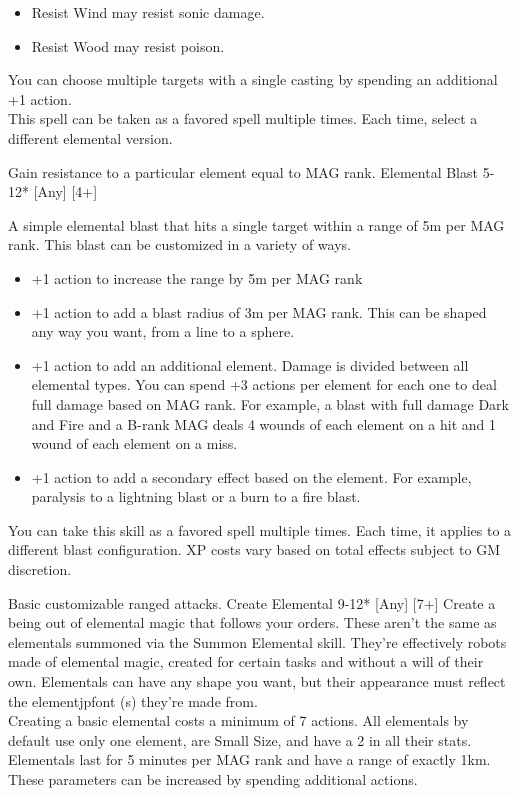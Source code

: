 \begin{pathele}
{\begin{itemize}
\item Resist Wind may resist sonic damage.
\item Resist Wood may resist poison.
\end{itemize}
You can choose multiple targets with a single casting by spending an additional +1 action.\\This spell can be taken as a favored spell multiple times. Each time, select a different elemental version.}
{Gain resistance to a particular element equal to MAG rank.}
\spelldescription
{Elemental Blast}
{5-12*}
[Any]
[4+]
{A simple elemental blast that hits a single target within a range of 5m per MAG rank. This blast can be customized in a variety of ways.
\begin{itemize}
\item +1 action to increase the range by 5m per MAG rank
\item +1 action to add a blast radius of 3m per MAG rank. This can be shaped any way you want, from a line to a sphere.
\item +1 action to add an additional element. Damage is divided between all elemental types. You can spend +3 actions per element for each one to deal full damage based on MAG rank. For example, a blast with full damage Dark and Fire and a B-rank MAG deals 4 wounds of each element on a hit and 1 wound of each element on a miss.
\item +1 action to add a secondary effect based on the element. For example, paralysis to a lightning blast or a burn to a fire blast.
\end{itemize}
You can take this skill as a favored spell multiple times. Each time, it applies to a different blast configuration. XP costs vary based on total effects subject to GM discretion.}
{Basic customizable ranged attacks.}
\spelldescription
{Create Elemental}
{9-12*}
[Any]
[7+]
{Create a being out of elemental magic that follows your orders. These aren't the same as elementals summoned via the Summon Elemental skill. They're effectively robots made of elemental magic, created for certain tasks and without a will of their own. Elementals can have any shape you want, but their appearance must reflect the element{jpfont (s)} they're made from.\\
Creating a basic elemental costs a minimum of 7 actions. All elementals by default use only one element, are Small Size, and have a 2 in all their stats. Elementals last for 5 minutes per MAG rank and have a range of exactly 1km. These parameters can be increased by spending additional actions.
}
\end{pathele}
